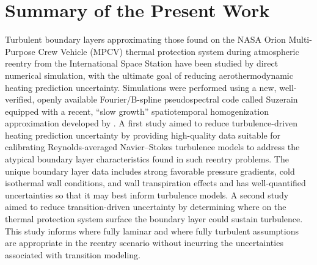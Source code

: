 \label{sec:conclusions}

\section{Summary of the Present Work}

Turbulent boundary layers approximating those found on the NASA Orion
Multi-Purpose Crew Vehicle (MPCV) thermal protection system during atmospheric
reentry from the International Space Station have been studied by direct
numerical simulation, with the ultimate goal of reducing aerothermodynamic heating prediction
uncertainty.
%
Simulations were performed using a new, well-verified, openly available
Fourier/B-spline pseudospectral code called Suzerain equipped with a recent,
``slow growth'' spatiotemporal homogenization approximation developed by
\citet{Topalian2014Spatiotemporal}.
%
A first study aimed to reduce turbulence-driven heating prediction uncertainty
by providing high-quality data suitable for calibrating Reynolds-averaged Navier--Stokes turbulence
models to address the atypical boundary layer characteristics found in such reentry problems.
%
The unique boundary layer data includes strong favorable pressure gradients,
cold isothermal wall conditions, and wall transpiration effects and has
well-quantified uncertainties so that it may best inform turbulence models.
%
A second study aimed to reduce transition-driven uncertainty by determining where
on the thermal protection system surface the boundary layer could sustain
turbulence.
%
This study informs where fully laminar and where fully turbulent assumptions are
appropriate in the reentry scenario without incurring the uncertainties
associated with transition modeling.


